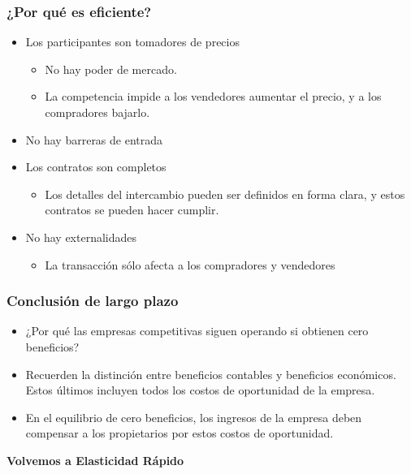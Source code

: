 \documentclass{beamer}
\begin{document}
\begin{frame}
\frametitle{¿Por qué es eficiente?}
\begin{itemize}
    \item Los participantes son tomadores de precios
    \begin{itemize}
        \item No hay poder de mercado.
        \item La competencia impide a los vendedores aumentar el precio, y a los compradores bajarlo.
    \end{itemize}
    \item No hay barreras de entrada
    \item Los contratos son completos
        \begin{itemize}
        \item Los detalles del intercambio pueden ser definidos en forma clara, y estos contratos se pueden hacer cumplir.
        \end{itemize}
    \item No hay externalidades
        \begin{itemize}
        \item La transacción sólo afecta a los compradores y vendedores
        \end{itemize}
\end{itemize}
\end{frame}

\begin{frame}
\frametitle{Conclusión de largo plazo}

\begin{itemize}
\item ¿Por qué las empresas competitivas siguen operando si obtienen cero beneficios?
\item Recuerden la distinción entre beneficios contables y beneficios económicos. Estos últimos incluyen todos los costos de oportunidad de la empresa.
\item En el equilibrio de cero beneficios, los ingresos de la empresa deben compensar a los propietarios por estos costos de oportunidad.

\end{itemize}
\end{frame}

\begin{frame}
    \centering
    \begin{boxB}
    \centering \Large \textbf{Volvemos a Elasticidad Rápido} \\   
    \end{boxB}
\end{frame}
\end{document}
